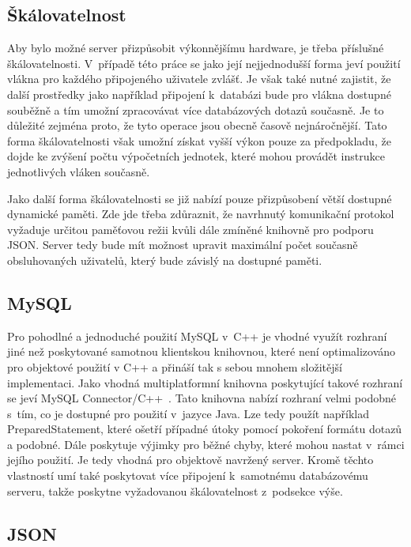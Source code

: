 \documentclass[thesis=B,czech]{FITthesis}[2013/10/20]
\begin{document}
\subsection{Škálovatelnost}

Aby bylo možné server přizpůsobit výkonnějšímu hardware, je třeba příslušné škálovatelnosti. V~případě této práce se jako její nejjednodušší forma jeví použití vlákna pro každého připojeného uživatele zvlášť. Je však také nutné zajistit, že další prostředky jako například připojení k~databázi bude pro vlákna dostupné souběžně a tím umožní zpracovávat více databázových dotazů současně. Je to důležité zejména proto, že tyto operace jsou obecně časově nejnáročnější. Tato forma škálovatelnosti však umožní získat vyšší výkon pouze za předpokladu, že dojde ke zvýšení počtu výpočetních jednotek, které mohou provádět instrukce jednotlivých vláken současně.

Jako další forma škálovatelnosti se již nabízí pouze přizpůsobení větší dostupné dynamické paměti. Zde jde třeba zdůraznit, že navrhnutý komunikační protokol vyžaduje určitou paměťovou režii kvůli dále zmíněné knihovně pro podporu JSON. Server tedy bude mít možnost upravit maximální počet současně obsluhovaných uživatelů, který bude závislý na dostupné paměti.

\subsection{MySQL}

Pro pohodlné a jednoduché použití MySQL v~C++ je vhodné využít rozhraní jiné než poskytované samotnou klientskou knihovnou, které není optimalizováno pro objektové použití v C++ a přináší tak s sebou mnohem složitější implementaci. Jako vhodná multiplatformní knihovna poskytující takové rozhraní se jeví MySQL Connector/C++~\cite{mysqlconn}. Tato knihovna nabízí rozhraní velmi podobné s~tím, co je dostupné pro použití v~jazyce Java. Lze tedy použít například PreparedStatement, které ošetří případné útoky pomocí pokoření formátu dotazů a podobné. Dále poskytuje výjimky pro běžné chyby, které mohou nastat v~rámci jejího použití. Je tedy vhodná pro objektově navržený server. Kromě těchto vlastností umí také poskytovat více připojení k~samotnému databázovému serveru, takže poskytne vyžadovanou škálovatelnost z~podsekce výše.

\subsection{JSON}
\end{document}
